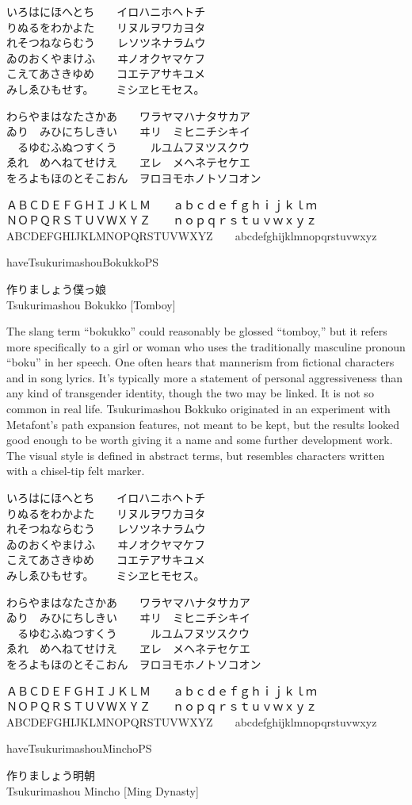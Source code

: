 \documentclass[14pt]{extarticle}
\newcommand{\iroha}{%
いろはにほへとち~~~~イロハニホヘトチ\\
りぬるをわかよた~~~~リヌルヲワカヨタ\\
れそつねならむう~~~~レソツネナラムウ\\
ゐのおくやまけふ~~~~ヰノオクヤマケフ\\
こえてあさきゆめ~~~~コエテアサキユメ\\
みしゑひもせす。~~~~ミシヱヒモセス。\par
}
\newcommand{\gojuuonzu}{%
わらやまはなたさかあ~~~~ワラヤマハナタサカア\\
ゐり~~みひにちしきい~~~~ヰリ~~ミヒニチシキイ\\
~~るゆむふぬつすくう~~~~~~ルユムフヌツスクウ\\
ゑれ~~めへねてせけえ~~~~ヱレ~~メヘネテセケエ\\
をろよもほのとそこおん~~ヲロヨモホノトソコオン\par
}
\begin{document}
\tenshinokamimono
\iroha
\gojuuonzu

ＡＢＣＤＥＦＧＨＩＪＫＬＭ~~~~ａｂｃｄｅｆｇｈｉｊｋｌｍ\\
ＮＯＰＱＲＳＴＵＶＷＸＹＺ~~~~ｎｏｐｑｒｓｔｕｖｗｘｙｚ\\
ABCDEFGHIJKLMNOPQRSTUVWXYZ~~~~abcdefghijklmnopqrstuvwxyz

\clearpage

\fi


\expandafter\ifx\csname haveTsukurimashouBokukkoPS\endcsname\relax\else

\bokukko

\Large
作りましょう僕っ娘\\
Tsukurimashou Bokukko [Tomboy]

\normalsize

The slang term ``bokukko'' could reasonably be glossed ``tomboy,'' but
it refers more specifically to a girl or woman who
uses the traditionally masculine pronoun ``boku'' in her speech.  One often
hears that mannerism from fictional characters and in song lyrics.  It's
typically more a statement of personal aggressiveness than any kind of
transgender identity, though the two may be linked. It is not so common in
real life.  Tsukurimashou Bokkuko originated in an experiment with
Metafont's path expansion features, not meant to be kept, but the results
looked good enough to be worth giving it a name and some further development
work.  The visual style is defined in abstract terms, but resembles
characters written with a chisel-tip felt marker.

\bokukkomono
\iroha
\gojuuonzu

ＡＢＣＤＥＦＧＨＩＪＫＬＭ~~~~ａｂｃｄｅｆｇｈｉｊｋｌｍ\\
ＮＯＰＱＲＳＴＵＶＷＸＹＺ~~~~ｎｏｐｑｒｓｔｕｖｗｘｙｚ\\
ABCDEFGHIJKLMNOPQRSTUVWXYZ~~~~abcdefghijklmnopqrstuvwxyz

\clearpage

\fi


\expandafter\ifx\csname haveTsukurimashouMinchoPS\endcsname\relax\else

\mincho

\Large
作りましょう明朝\\
Tsukurimashou Mincho [Ming Dynasty]
\end{document}
